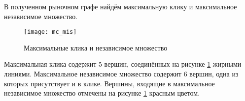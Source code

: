 В полученном рыночном графе найдём максимальную клику и максимальное независимое множество.

\begin{figure}[H]
\centering
\texttt{[image: mc\_mis]}
\caption{Максимальные клика и независимое множество}
\label{fig:mc_mis}
\end{figure}

Максимальная клика содержит 5 вершин, соединённых на рисунке \ref{fig:mc_mis} жирными линиями. Максимальное независимое множество содержит 6 вершин, одна из которых присутствует и в клике. Вершины, входящие в максимальное независимое множество отмечены на рисунке \ref{fig:mc_mis}  красным цветом.

